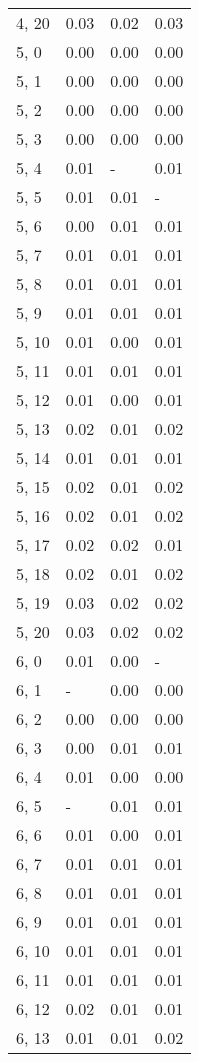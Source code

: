 \begin{table}
\begin{tabular}{llll}
4, 20  &  0.03 &  0.02 &  0.03 \\
5, 0   &  0.00 &  0.00 &  0.00 \\
5, 1   &  0.00 &  0.00 &  0.00 \\
5, 2   &  0.00 &  0.00 &  0.00 \\
5, 3   &  0.00 &  0.00 &  0.00 \\
5, 4   &  0.01 &     - &  0.01 \\
5, 5   &  0.01 &  0.01 &     - \\
5, 6   &  0.00 &  0.01 &  0.01 \\
5, 7   &  0.01 &  0.01 &  0.01 \\
5, 8   &  0.01 &  0.01 &  0.01 \\
5, 9   &  0.01 &  0.01 &  0.01 \\
5, 10  &  0.01 &  0.00 &  0.01 \\
5, 11  &  0.01 &  0.01 &  0.01 \\
5, 12  &  0.01 &  0.00 &  0.01 \\
5, 13  &  0.02 &  0.01 &  0.02 \\
5, 14  &  0.01 &  0.01 &  0.01 \\
5, 15  &  0.02 &  0.01 &  0.02 \\
5, 16  &  0.02 &  0.01 &  0.02 \\
5, 17  &  0.02 &  0.02 &  0.01 \\
5, 18  &  0.02 &  0.01 &  0.02 \\
5, 19  &  0.03 &  0.02 &  0.02 \\
5, 20  &  0.03 &  0.02 &  0.02 \\
6, 0   &  0.01 &  0.00 &     - \\
6, 1   &     - &  0.00 &  0.00 \\
6, 2   &  0.00 &  0.00 &  0.00 \\
6, 3   &  0.00 &  0.01 &  0.01 \\
6, 4   &  0.01 &  0.00 &  0.00 \\
6, 5   &     - &  0.01 &  0.01 \\
6, 6   &  0.01 &  0.00 &  0.01 \\
6, 7   &  0.01 &  0.01 &  0.01 \\
6, 8   &  0.01 &  0.01 &  0.01 \\
6, 9   &  0.01 &  0.01 &  0.01 \\
6, 10  &  0.01 &  0.01 &  0.01 \\
6, 11  &  0.01 &  0.01 &  0.01 \\
6, 12  &  0.02 &  0.01 &  0.01 \\
6, 13  &  0.01 &  0.01 &  0.02 \\

\end{tabular}
\end{table}

